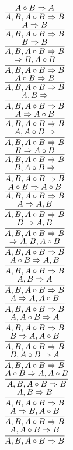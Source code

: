 \documentclass[11pt]{article}
\begin{document}
\begin{center}
\bigskip
\\$\infer{A, B, A\circ B\Rightarrow B}{A\circ B\Rightarrow A}$
\bigskip
\\$\infer{A, B, A\circ B\Rightarrow B}{A\Rightarrow B}$
\bigskip
\\$\infer{A, B, A\circ B\Rightarrow B}{B\Rightarrow B}$
\bigskip
\\$\infer{A, B, A\circ B\Rightarrow B}{\Rightarrow B, A\circ B}$
\bigskip
\\$\infer{A, B, A\circ B\Rightarrow B}{A\circ B\Rightarrow B}$
\bigskip
\\$\infer{A, B, A\circ B\Rightarrow B}{A, B\Rightarrow }$
\bigskip
\\$\infer{A, B, A\circ B\Rightarrow B}{A\Rightarrow A\circ B}$
\bigskip
\\$\infer{A, B, A\circ B\Rightarrow B}{A, A\circ B\Rightarrow }$
\bigskip
\\$\infer{A, B, A\circ B\Rightarrow B}{B\Rightarrow A\circ B}$
\bigskip
\\$\infer{A, B, A\circ B\Rightarrow B}{B, A\circ B\Rightarrow }$
\bigskip
\\$\infer{A, B, A\circ B\Rightarrow B}{A\circ B\Rightarrow A\circ B}$
\bigskip
\\$\infer{A, B, A\circ B\Rightarrow B}{A\Rightarrow A, B}$
\bigskip
\\$\infer{A, B, A\circ B\Rightarrow B}{B\Rightarrow A, B}$
\bigskip
\\$\infer{A, B, A\circ B\Rightarrow B}{\Rightarrow A, B, A\circ B}$
\bigskip
\\$\infer{A, B, A\circ B\Rightarrow B}{A\circ B\Rightarrow A, B}$
\bigskip
\\$\infer{A, B, A\circ B\Rightarrow B}{A, B\Rightarrow A}$
\bigskip
\\$\infer{A, B, A\circ B\Rightarrow B}{A\Rightarrow A, A\circ B}$
\bigskip
\\$\infer{A, B, A\circ B\Rightarrow B}{A, A\circ B\Rightarrow A}$
\bigskip
\\$\infer{A, B, A\circ B\Rightarrow B}{B\Rightarrow A, A\circ B}$
\bigskip
\\$\infer{A, B, A\circ B\Rightarrow B}{B, A\circ B\Rightarrow A}$
\bigskip
\\$\infer{A, B, A\circ B\Rightarrow B}{A\circ B\Rightarrow A, A\circ B}$
\bigskip
\\$\infer{A, B, A\circ B\Rightarrow B}{A, B\Rightarrow B}$
\bigskip
\\$\infer{A, B, A\circ B\Rightarrow B}{A\Rightarrow B, A\circ B}$
\bigskip
\\$\infer{A, B, A\circ B\Rightarrow B}{A, A\circ B\Rightarrow B}$

\end{center}
\end{document}

